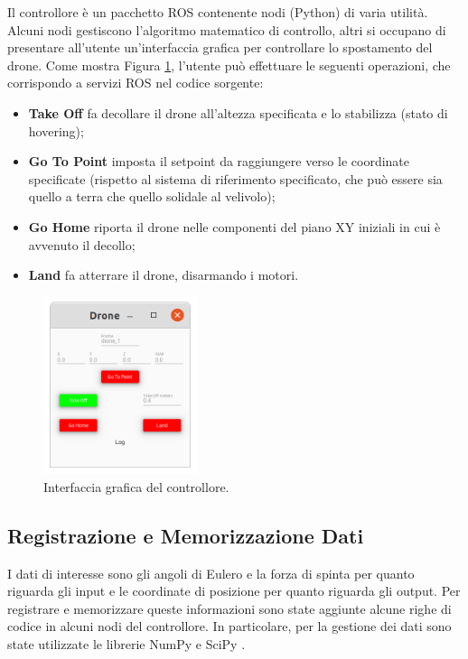 Il controllore è un pacchetto \acs{ROS} contenente nodi (Python) di varia utilità. Alcuni nodi gestiscono l'algoritmo matematico di controllo, altri si occupano di presentare all'utente un'interfaccia grafica per controllare lo spostamento del drone. Come mostra Figura \ref{fig:drone_controller}, l'utente può effettuare le seguenti operazioni, che corrispondo a servizi \acs{ROS} nel codice sorgente:
\begin{itemize}
	\item \textbf{Take Off} fa decollare il drone all'altezza specificata e lo stabilizza (stato di hovering);
	\item \textbf{Go To Point} imposta il setpoint da raggiungere verso le coordinate specificate (rispetto al sistema di riferimento specificato, che può essere sia quello a terra che quello solidale al velivolo);
	\item \textbf{Go Home} riporta il drone nelle componenti del piano XY iniziali in cui è avvenuto il decollo;
	\item \textbf{Land} fa atterrare il drone, disarmando i motori.
\end{itemize}

\begin{figure}[H]
	\centering
	\includegraphics[width=0.4\textwidth]{gfx/ROS/drone_controller}
	\caption[Interfaccia grafica del controllore.]{Interfaccia grafica del controllore.}
	\label{fig:drone_controller}
\end{figure}

\subsection{Registrazione e Memorizzazione Dati}
I dati di interesse sono gli angoli di Eulero e la forza di spinta per quanto riguarda gli input e le coordinate di posizione per quanto riguarda gli output. Per registrare e memorizzare queste informazioni sono state aggiunte alcune righe di codice in alcuni nodi del controllore. In particolare, per la gestione dei dati sono state utilizzate le librerie NumPy \cite{numPy} e SciPy \cite{sciPy}.\\

